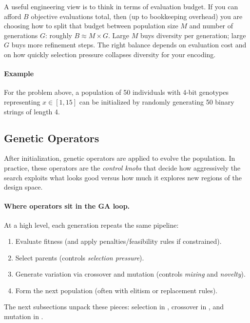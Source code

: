 \noindent A useful engineering view is to think in terms of evaluation budget. If you can afford \(B\) objective evaluations total, then (up to bookkeeping overhead) you are choosing how to split that budget between population size \(M\) and number of generations \(G\): roughly \(B \approx M \times G\). Large \(M\) buys diversity per generation; large \(G\) buys more refinement steps. The right balance depends on evaluation cost and on how quickly selection pressure collapses diversity for your encoding.

\paragraph{Example}
For the problem above, a population of 50 individuals with 4-bit genotypes representing \( x \in [1,15] \) can be initialized by randomly generating 50 binary strings of length 4.

\subsection{Genetic Operators}
\label{sec:evo_genetic_operators}

After initialization, genetic operators are applied to evolve the population. In practice, these operators
are the \emph{control knobs} that decide how aggressively the search exploits what looks good versus how
much it explores new regions of the design space.

\paragraph{Where operators sit in the GA loop.}
At a high level, each generation repeats the same pipeline:
\begin{enumerate}
    \item Evaluate fitness (and apply penalties/feasibility rules if constrained).
    \item Select parents (controls \emph{selection pressure}).
    \item Generate variation via crossover and mutation (controls \emph{mixing} and \emph{novelty}).
    \item Form the next population (often with elitism or replacement rules).
\end{enumerate}

The next subsections unpack these pieces: selection in , crossover in , and mutation in .

